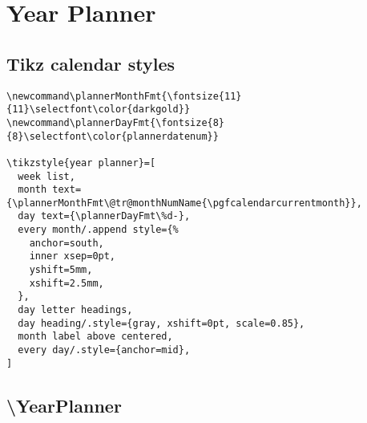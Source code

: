\documentclass[11pt,oneside]{memoir-article}
\begin{document}
\chapter{Year Planner}
\label{sec-11}
\section{Tikz calendar styles}
\label{sec-11-1}

\begin{verbatim}
\newcommand\plannerMonthFmt{\fontsize{11}{11}\selectfont\color{darkgold}}
\newcommand\plannerDayFmt{\fontsize{8}{8}\selectfont\color{plannerdatenum}}

\tikzstyle{year planner}=[
  week list,
  month text={\plannerMonthFmt\@tr@monthNumName{\pgfcalendarcurrentmonth}},
  day text={\plannerDayFmt\%d-},
  every month/.append style={%
    anchor=south,
    inner xsep=0pt,
    yshift=5mm,
    xshift=2.5mm,
  },
  day letter headings,
  day heading/.style={gray, xshift=0pt, scale=0.85},
  month label above centered,
  every day/.style={anchor=mid},
]
\end{verbatim}

\section{\textbackslash YearPlanner}
\label{sec-11-2}
\end{document}
